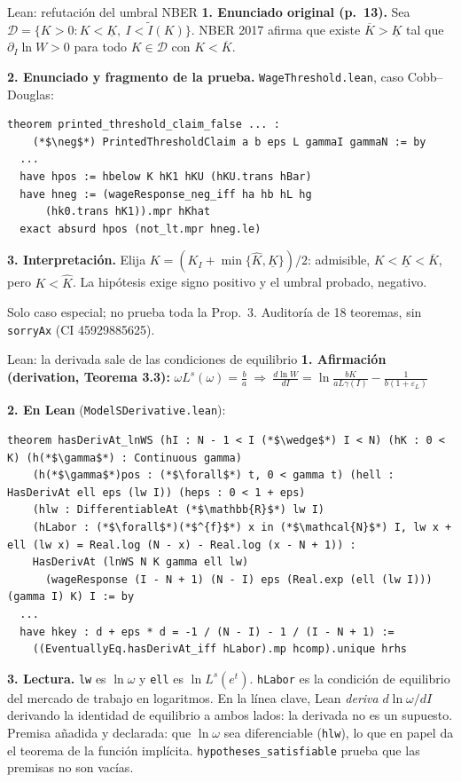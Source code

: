 \documentclass[aspectratio=169,10pt]{beamer}
\newcommand{\Kl}{\underline K}
\newcommand{\Kb}{\overline K}
\newcommand{\Kh}{\hat K}
\newcommand{\eps}{\varepsilon}
\begin{document}
\begin{frame}[fragile]{Lean: refutación del umbral NBER}
\footnotesize
\textbf{1. Enunciado original (p.~13).} Sea $\mathcal D=\{K>0:K<\Kl,\ I<\tilde I(K)\}$.
NBER 2017 afirma que existe $\Kb>\Kl$ tal que $\partial_I\ln W>0$ para todo $K\in\mathcal D$ con $K<\Kb$.

\smallskip
\textbf{2. Enunciado y fragmento de la prueba.} \texttt{WageThreshold.lean}, caso Cobb--Douglas:
\begin{lstlisting}
theorem printed_threshold_claim_false ... :
    (*$\neg$*) PrintedThresholdClaim a b eps L gammaI gammaN := by
  ...
  have hpos := hbelow K hK1 hKU (hKU.trans hBar)
  have hneg := (wageResponse_neg_iff ha hb hL hg
      (hk0.trans hK1)).mpr hKhat
  exact absurd hpos (not_lt.mpr hneg.le)
\end{lstlisting}
\textbf{3. Interpretación.} Elija $K=(K_I+\min\{\Kh,\Kl\})/2$: admisible, $K<\Kl<\Kb$, pero $K<\Kh$. La hipótesis exige signo positivo y el umbral probado, negativo.

\smallskip
Solo caso especial; no prueba toda la Prop.~3. Auditoría de 18 teoremas, sin \texttt{sorryAx} (CI 45929885625).
\end{frame}

\begin{frame}[fragile]{Lean: la derivada sale de las condiciones de equilibrio}
\scriptsize
\textbf{1. Afirmación (derivation, Teorema 3.3):}\quad
$\omega L^s(\omega)=\frac ba\ \Longrightarrow\ \frac{d\ln W}{dI}=\ln\frac{bK}{aL\gamma(I)}-\frac{1}{b(1+\eps_L)}$

\smallskip\textbf{2. En Lean} (\texttt{ModelSDerivative.lean}):
\begin{lstlisting}[basicstyle=\ttfamily\scriptsize]
theorem hasDerivAt_lnWS (hI : N - 1 < I (*$\wedge$*) I < N) (hK : 0 < K) (h(*$\gamma$*) : Continuous gamma)
    (h(*$\gamma$*)pos : (*$\forall$*) t, 0 < gamma t) (hell : HasDerivAt ell eps (lw I)) (heps : 0 < 1 + eps)
    (hlw : DifferentiableAt (*$\mathbb{R}$*) lw I)
    (hLabor : (*$\forall$*)(*$^{f}$*) x in (*$\mathcal{N}$*) I, lw x + ell (lw x) = Real.log (N - x) - Real.log (x - N + 1)) :
    HasDerivAt (lnWS N K gamma ell lw)
      (wageResponse (I - N + 1) (N - I) eps (Real.exp (ell (lw I))) (gamma I) K) I := by
  ...
  have hkey : d + eps * d = -1 / (N - I) - 1 / (I - N + 1) :=
    ((EventuallyEq.hasDerivAt_iff hLabor).mp hcomp).unique hrhs
\end{lstlisting}
\textbf{3. Lectura.} \texttt{lw} es $\ln\omega$ y \texttt{ell} es $\ln L^s(e^t)$. \texttt{hLabor} es la condición de equilibrio del mercado de trabajo en logaritmos.
En la línea clave, Lean \emph{deriva} $d\ln\omega/dI$ derivando la identidad de equilibrio a ambos lados: la derivada no es un supuesto.
Premisa añadida y declarada: que $\ln\omega$ sea diferenciable (\texttt{hlw}), lo que en papel da el teorema de la función implícita.
\texttt{hypotheses\_satisfiable} prueba que las premisas no son vacías.
\end{frame}
\end{document}
